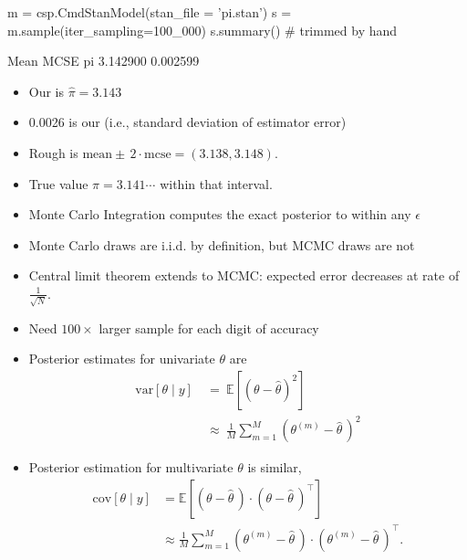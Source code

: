 \documentclass[10pt]{report}
\begin{document}
%
\begin{codein}
m = csp.CmdStanModel(stan_file = 'pi.stan')
s = m.sample(iter_sampling=100_000)
s.summary()  # trimmed by hand
\end{codein}
\begin{codeout}
               Mean      MCSE
pi         3.142900  0.002599
\end{codeout}
\begin{itemize}
\item Our  is $\widehat{\pi} = 3.143$
\item 0.0026 is our  (i.e., standard deviation of estimator error)
\item Rough  is $\textrm{mean} \pm\, 2 \cdot \textrm{mcse} = (3.138, 3.148)$.
\item True value $\pi=3.141\cdots$ within that interval.
\end{itemize}


%
\begin{itemize}
\item Monte Carlo Integration computes the exact posterior to within any $\epsilon$
\item Monte Carlo draws are i.i.d. by definition, but MCMC draws are not
\item Central limit theorem extends to MCMC: expected error decreases at rate of $\frac{1}{\sqrt{N}}$. 
\item Need $100 \times$ larger sample for each digit of accuracy
\end{itemize}

%
\begin{itemize}
\item Posterior  estimates for univariate $\theta$ are 
\begin{align*}
\mathrm{var}[\theta \mid y]
\ &= \
    \mathbb{E}\!\left[ (\theta - \widehat{\theta})^2 \right]
\\
\ &\approx \
\frac{1}{M} \sum_{m=1}^M \left(\theta^{(m)} - \widehat{\theta}\,\right)^2
\end{align*}
\item Posterior \myemph{parameter covariance} estimation for multivariate $\theta$ is similar,
\begin{align*}
  \mathrm{cov}[\theta \mid y]
  &= \mathbb{E}\!\left[(\theta - \widehat{\theta}\,) \cdot
      (\theta - \widehat{\theta}\,)^\top\right]
  \\ &\approx
  \frac{1}{M} \sum_{m=1}^M \left(\theta^{(m)} - \widehat{\theta}\,\right)
                          \cdot \left(\theta^{(m)} - \widehat{\theta}\,\right)^\top.
\end{align*}
\end{itemize}
\end{document}
